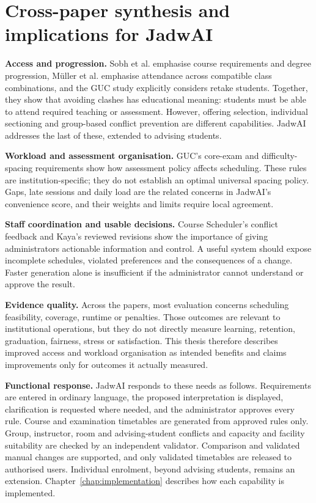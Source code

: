 \section[Cross-paper synthesis]{Cross-paper synthesis and implications for JadwAI}
\textbf{Access and progression.} Sobh et al. emphasise course requirements and degree progression, Müller et al. emphasise attendance across compatible class combinations, and the GUC study explicitly considers retake students. Together, they show that avoiding clashes has educational meaning: students must be able to attend required teaching or assessment. However, offering selection, individual sectioning and group-based conflict prevention are different capabilities. JadwAI addresses the last of these, extended to advising students.

\textbf{Workload and assessment organisation.} GUC's core-exam and difficulty-spacing requirements show how assessment policy affects scheduling. These rules are institution-specific; they do not establish an optimal universal spacing policy. Gaps, late sessions and daily load are the related concerns in JadwAI's convenience score, and their weights and limits require local agreement.

\textbf{Staff coordination and usable decisions.} Course Scheduler's conflict feedback and Kaya's reviewed revisions show the importance of giving administrators actionable information and control. A useful system should expose incomplete schedules, violated preferences and the consequences of a change. Faster generation alone is insufficient if the administrator cannot understand or approve the result.

\textbf{Evidence quality.} Across the papers, most evaluation concerns scheduling feasibility, coverage, runtime or penalties. Those outcomes are relevant to institutional operations, but they do not directly measure learning, retention, graduation, fairness, stress or satisfaction. This thesis therefore describes improved access and workload organisation as intended benefits and claims improvements only for outcomes it actually measured.

\textbf{Functional response.} JadwAI responds to these needs as follows. Requirements are entered in ordinary language, the proposed interpretation is displayed, clarification is requested where needed, and the administrator approves every rule. Course and examination timetables are generated from approved rules only. Group, instructor, room and advising-student conflicts and capacity and facility suitability are checked by an independent validator. Comparison and validated manual changes are supported, and only validated timetables are released to authorised users. Individual enrolment, beyond advising students, remains an extension. Chapter~\ref{chap:implementation} describes how each capability is implemented.

